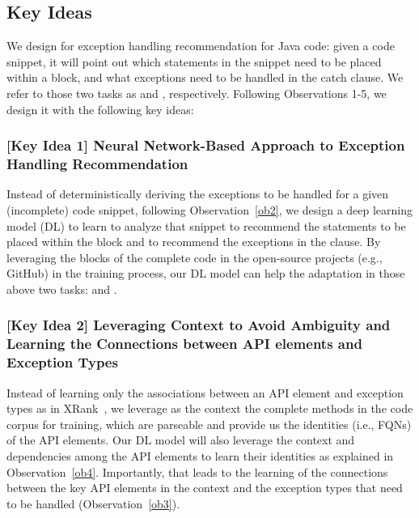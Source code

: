 \subsection{Key Ideas}
\label{key:sec}

\noindent We design {\tool} for exception handling recommendation for
Java code: given a code snippet, it will point out which statements in
the snippet need to be placed within a  block, and
what exceptions need to be handled in the catch clause. We refer to
those two tasks as {\xstate} and {\xtype}, respectively. Following
Observations 1-5, we design it with the following key ideas:

\subsubsection{{\bf [Key Idea 1] Neural Network-Based Approach to Exception Handling Recommendation}}
Instead of deterministically deriving the exceptions to be handled for
a given (incomplete) code snippet, following Observation~\ref{ob2}, we
design a deep learning model (DL) to learn to analyze that snippet to
recommend the statements to be placed within the 
block and to recommend the exceptions in the  clause.  By
leveraging the  blocks of the complete code in the
open-source projects (e.g., GitHub) in the training process, our DL
model can help the adaptation in those above two tasks: {\xstate} and
{\xtype}.


\vspace{2pt}
\subsubsection{{\bf [Key Idea 2] Leveraging Context to Avoid
Ambiguity and Learning the Connections between API elements and
Exception Types}} Instead of learning only the associations between an
API element and exception types as in XRank~\cite{xrank-fse20}, we
leverage as the context the complete methods in the code corpus for
training, which are parseable and provide us the identities (i.e.,
FQNs) of the API elements. Our DL model will also leverage the context
and dependencies among the API elements to learn their identities as
explained in Observation~\ref{ob4}. Importantly, that leads to the
learning of the connections between the key API elements in the
context and the exception types that need to be handled
(Observation~\ref{ob3}).

